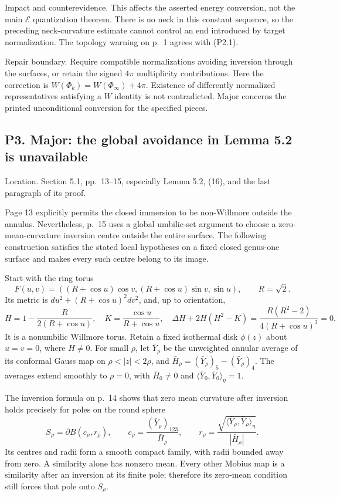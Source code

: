 \documentclass[10pt]{article}
\begin{document}
Impact and counterevidence. This affects the asserted energy conversion, not the main \(\mathcal E\) quantization theorem. There is no neck in this constant sequence, so the preceding neck-curvature estimate cannot control an end introduced by target normalization. The topology warning on p. 1 agrees with (P2.1).\par
Repair boundary. Require compatible normalizations avoiding inversion through the surfaces, or retain the signed \(4\pi\) multiplicity contributions. Here the correction is \(W(\Phi_k)=W(\Phi_\infty)+4\pi\). Existence of differently normalized representatives satisfying a \(W\) identity is not contradicted. Major concerns the printed unconditional conversion for the specified pieces.\par
\subsection*{P3. Major: the global avoidance in Lemma 5.2 is unavailable}
Location. Section 5.1, pp. 13–15, especially Lemma 5.2, (16), and the last paragraph of its proof.\par
Page 13 explicitly permits the closed immersion to be non-Willmore outside the annulus. Nevertheless, p. 15 uses a global umbilic-set argument to choose a zero-mean-curvature inversion centre outside the entire surface. The following construction satisfies the stated local hypotheses on a fixed closed genus-one surface and makes every such centre belong to its image.\par
Start with the ring torus \[F(u,v)=((R+\cos u)\cos v,(R+\cos u)\sin v,\sin u),\qquad R=\sqrt2.\] Its metric is \(du^2+(R+\cos u)^2dv^2\), and, up to orientation, \[H=1-\frac{R}{2(R+\cos u)},\quad
 K=\frac{\cos u}{R+\cos u},\quad
 \Delta H+2H(H^2-K)=\frac{R(R^2-2)}{4(R+\cos u)^3}=0.\] It is a nonumbilic Willmore torus. Retain a fixed isothermal disk \(\phi(z)\) about \(u=v=0\), where \(H\ne0\). For small \(\rho\), let \(\bar Y_\rho\) be the unweighted annular average of its conformal Gauss map on \(\rho<|z|<2\rho\), and \(\bar H_\rho=(\bar Y_\rho)_5-(\bar Y_\rho)_4\). The averages extend smoothly to \(\rho=0\), with \(\bar H_0\ne0\) and \(\langle \bar Y_0,\bar Y_0\rangle_\eta=1\).\par
The inversion formula on p. 14 shows that zero mean curvature after inversion holds precisely for poles on the round sphere \[S_\rho=\partial B(c_\rho,r_\rho),\qquad
 c_\rho=\frac{(\bar Y_\rho)_{123}}{\bar H_\rho},\qquad
 r_\rho=\frac{\sqrt{\langle \bar Y_\rho,\bar Y_\rho\rangle_\eta}}
               {|\bar H_\rho|}.
 \tag{P3.1}\] Its centres and radii form a smooth compact family, with radii bounded away from zero. A similarity alone has nonzero mean. Every other Mobius map is a similarity after an inversion at its finite pole; therefore its zero-mean condition still forces that pole onto \(S_\rho\).\par
\end{document}
